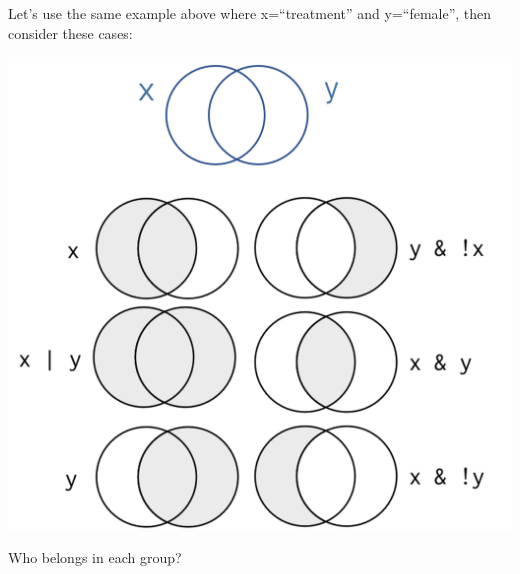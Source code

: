 \documentclass[]{book}
\theoremstyle{definition}
\theoremstyle{definition}
\theoremstyle{definition}
\theoremstyle{remark}
\begin{document}
Let's use the same example above where x=``treatment'' and y=``female'',
then consider these cases:

\includegraphics{figures/set_theory.png}

Who belongs in each group?
\end{document}

